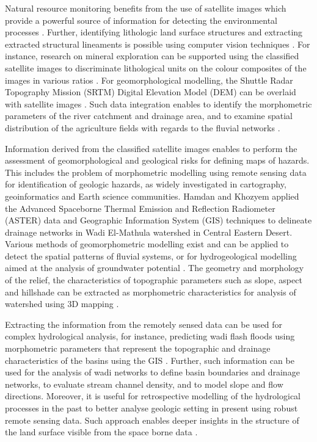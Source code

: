 \documentclass[information,article,submit,pdftex,moreauthors]{Definitions/mdpi}
\begin{document}
Natural resource monitoring benefits from the use of satellite images which provide a powerful source of information for detecting the environmental processes \cite{Khafagy}. Further, identifying lithologic land surface structures and extracting extracted structural lineaments is possible using computer vision techniques \cite{Bishta,Kusky,Salman}. For instance, research on mineral exploration can be supported using the classified satellite images to discriminate lithological units on the colour composites of the images in various ratios \cite{Shalaby}. For geomorphological modelling, the Shuttle Radar Topography Mission (SRTM) Digital Elevation Model (DEM) can be overlaid with satellite images \cite{Liping}. Such data integration enables to identify the morphometric parameters of the river catchment and drainage area, and to examine spatial distribution of the agriculture fields with regards to the fluvial networks \cite{6265340}. 

Information derived from the classified satellite images enables to perform the assessment of geomorphological and geological risks for defining maps of hazards. This includes the problem of morphometric modelling using remote sensing data for identification of geologic hazards, as widely investigated in cartography, geoinformatics and Earth science communities. Hamdan and Khozyem \cite{Hamdan} applied the Advanced Spaceborne Thermal Emission and Reflection Radiometer  (ASTER) data and Geographic Information System (GIS) techniques to delineate drainage networks in Wadi El-Mathula watershed in Central Eastern Desert. Various methods of geomorphometric modelling exist and can be applied to detect the spatial patterns of fluvial systems, or for hydrogeological modelling aimed at the analysis of groundwater potential \cite{Issawi,Abdalla2020,Gaber}. The geometry and morphology of the relief, the characteristics of topographic parameters such as slope, aspect and hillshade can be extracted as morphometric characteristics for analysis of watershed using 3D mapping \cite{Lemenkova202301}. 

Extracting the information from the remotely sensed data can be used for complex hydrological analysis, for instance, predicting wadi flash floods using morphometric parameters that represent the topographic and drainage characteristics of the basins using the GIS \cite{w9070553}. Further, such information can be used for the analysis of wadi networks to define basin boundaries and drainage networks, to evaluate stream channel density, and to model slope and flow directions. Moreover, it is useful for retrospective modelling of the hydrological processes in the past to better analyse geologic setting in present using robust remote sensing data. Such approach enables deeper insights in the structure of the land surface visible from the space borne data \cite{abdelkareem2013integration,AbdelkareemFarouk}. 
\end{document}
